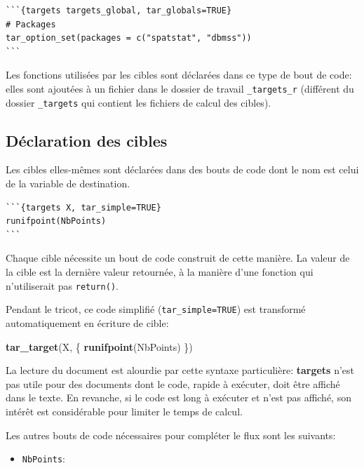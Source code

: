 \documentclass[
  12pt,
  french,
  a4paper,
  extrafontsizes,onecolumn,openright
  ]{memoir}
\newenvironment{Shaded}{\begin{snugshade}}{\end{snugshade}}
\newcommand{\FunctionTok}[1]{\textcolor[rgb]{0.13,0.29,0.53}{\textbf{#1}}}
\newcommand{\NormalTok}[1]{#1}
\providecommand{\tightlist}{%
  \setlength{\itemsep}{0pt}\setlength{\parskip}{0pt}}
\begin{document}
\begin{verbatim}
```{targets targets_global, tar_globals=TRUE}
# Packages
tar_option_set(packages = c("spatstat", "dbmss"))
```
\end{verbatim}

Les fonctions utilisées par les cibles sont déclarées dans ce type de bout de code: elles sont ajoutées à un fichier dans le dossier de travail \texttt{\_targets\_r} (différent du dossier \texttt{\_targets} qui contient les fichiers de calcul des cibles).

\subsection{Déclaration des cibles}\label{duxe9claration-des-cibles}

Les cibles elles-mêmes sont déclarées dans des bouts de code dont le nom est celui de la variable de destination.

\begin{verbatim}
```{targets X, tar_simple=TRUE}
runifpoint(NbPoints)
```
\end{verbatim}

Chaque cible nécessite un bout de code construit de cette manière.
La valeur de la cible est la dernière valeur retournée, à la manière d'une fonction qui n'utiliserait pas \texttt{return()}.

Pendant le tricot, ce code simplifié (\texttt{tar\_simple=TRUE}) est transformé automatiquement en écriture de cible:

\scriptsize

\begin{Shaded}
\begin{Highlighting}[]
\FunctionTok{tar\_target}\NormalTok{(X, \{}
  \FunctionTok{runifpoint}\NormalTok{(NbPoints)}
\NormalTok{\})}
\end{Highlighting}
\end{Shaded}

\normalsize

La lecture du document est alourdie par cette syntaxe particulière: \textbf{targets} n'est pas utile pour des documents dont le code, rapide à exécuter, doit être affiché dans le texte.
En revanche, si le code est long à exécuter et n'est pas affiché, son intérêt est considérable pour limiter le temps de calcul.

Les autres bouts de code nécessaires pour compléter le flux sont les suivants:

\begin{itemize}
\tightlist
\item
  \texttt{NbPoints}:
\end{itemize}
\end{document}
